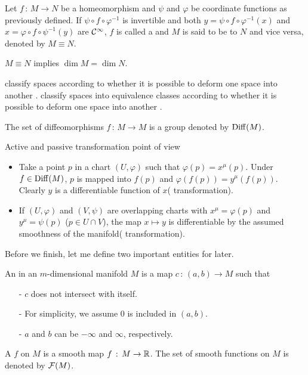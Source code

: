 \documentclass[a4paper, 10pt]{article}
\begin{document}
\begin{definition}[Diffeomorphism]
    Let $f \,:\, M \rightarrow N$ be a homeomorphism and $\psi$ and $\varphi$ be coordinate functions as previously defined. If $\psi\circ f\circ\varphi^{-1}$ is invertible and both $y = \psi\circ f\circ \varphi^{-1}(x)$ and $x = \varphi\circ f\circ\psi^{-1}(y)$ are $\mathcal{C}^{\infty}$, $f$ is called a  and $M$ is said to be  to $N$ and vice versa, denoted by $M\equiv N$.
\end{definition}

\begin{remark}
    $M\equiv N$ implies $\dim M = \dim N$.
\end{remark}
\begin{remark}
     classify spaces according to whether it is possible to deform one space into another .  classify spaces into equivalence classes according to whether it is possible to deform one space into another .
\end{remark}
\newpage


\begin{definition}
    The set of diffeomorphisms $f \,:\, M \rightarrow M$ is a group denoted by $\mathrm{Diff}(M)$.
\end{definition}

\begin{remark}
    Active and passive transformation point of view
    \begin{itemize}
        \item Take a point $p$ in a chart $(U, \varphi)$ such that $\varphi(p) = x^{\mu}(p)$. Under $f \in \mathrm{Diff}(M)$, $p$ is mapped into $f(p)$ and $\varphi(f(p)) = y^{\mu}(f(p))$. Clearly $y$ is a differentiable function of $x$( transformation).
        \item If $(U,\varphi)$ and $(V,\psi)$ are overlapping charts with $x^{\mu}=\varphi(p)$ and $y^{\mu} = \psi(p)$ ($p\in U\cap V$), the map $x \mapsto y$ is differentiable by the assumed smoothness of the manifold( transformation).
    \end{itemize}
\end{remark}

Before we finish, let me define two important entities for later.
\begin{definition}[Curves]
    An  in an $m$-dimensional manifold $M$ is a map $c\,:\,(a,b) \rightarrow M$ such that
    \begin{itemize}
        \item[-] $c$ does not intersect with itself.
        \item[-] For simplicity, we assume 0 is included in $(a,b)$.
        \item[-] $a$ and $b$ can be $-\infty$ and $\infty$, respectively.
    \end{itemize}
\end{definition}

\begin{definition}
    A  $f$ on $M$ is a smooth map $f \,:\, M \rightarrow \mathbb{R}$. The set of smooth functions on $M$ is denoted by $\mathcal{F}(M)$.
\end{definition}
\end{document}
